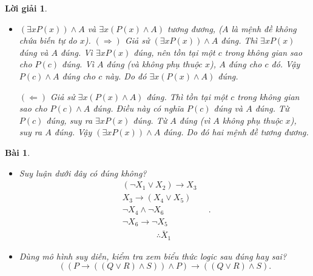 \documentclass[11pt, oneside, a4paper]{article}
\newtheorem{bt}{Bài}[section]
\newtheorem{loigiai}{Lời giải}[bt]
\begin{document}
\begin{loigiai}
\begin{itemize}
        \item[f)] $(\exists x P(x)) \land A$ và $\exists x (P(x) \land A)$ tương đương, ($A$ là mệnh đề không chứa biến tự do $x$).
        $(\Rightarrow)$ Giả sử $(\exists x P(x)) \land A$ đúng.
        Thì $\exists x P(x)$ đúng và $A$ đúng.
        Vì $\exists x P(x)$ đúng, nên tồn tại một $c$ trong không gian sao cho $P(c)$ đúng.
        Vì $A$ đúng (và không phụ thuộc $x$), $A$ đúng cho $c$ đó.
        Vậy $P(c) \land A$ đúng cho $c$ này.
        Do đó $\exists x (P(x) \land A)$ đúng.
    
        $(\Leftarrow)$ Giả sử $\exists x (P(x) \land A)$ đúng.
        Thì tồn tại một $c$ trong không gian sao cho $P(c) \land A$ đúng.
        Điều này có nghĩa $P(c)$ đúng và $A$ đúng.
        Từ $P(c)$ đúng, suy ra $\exists x P(x)$ đúng.
        Từ $A$ đúng (vì $A$ không phụ thuộc $x$), suy ra $A$ đúng.
        Vậy $(\exists x P(x)) \land A$ đúng.
        Do đó hai mệnh đề tương đương.
    \end{itemize}
    \end{loigiai}
    
    \begin{bt}
    \begin{itemize}
    \item[a)] Suy luận dưới đây có đúng không?
    $$ \begin{matrix}
         (\lnot X_1 \lor X_2) \rightarrow X_3\\
         X_3 \rightarrow (X_4 \lor X_5)\\
         \lnot X_4 \land \lnot X_6\\
         \lnot X_6 \rightarrow \lnot X_5\\
       \overline{\qquad \qquad \therefore X_1 \qquad \qquad}
    \end{matrix}.$$
    \item[b)] Dùng mô hình suy diễn, kiểm tra xem biểu thức logic sau đúng hay sai?
    $$((P \rightarrow ((Q \lor R) \land S)) \land P) \rightarrow ((Q \lor R) \land S).$$
    \end{itemize}
    \end{bt}
    
\end{document}
